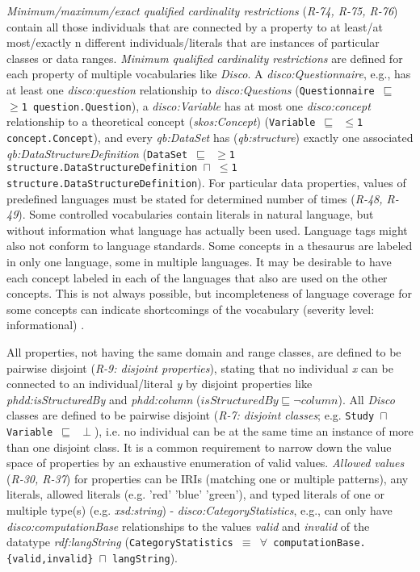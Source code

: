 \documentclass{llncs}
\newcommand{\ms}[1]{\texttt{#1}}
\begin{document}
{{\emph{Minimum/maximum/exact qualified cardinality restrictions} (\emph{R-74, R-75, R-76}) contain all those individuals that are connected by a property to at least/at most/exactly n different individuals/literals that are instances of particular classes or data ranges.
\emph{Minimum qualified cardinality restrictions} are defined for each property of multiple vocabularies like \emph{Disco}.
A \emph{disco:Questionnaire}, e.g., has at least one \emph{disco:question} relationship to \emph{disco:Questions} (\ms{Questionnaire $\sqsubseteq$ $\geq$1 question.Question}),
a \emph{disco:Variable} has at most one \emph{disco:concept} relationship to a theoretical concept (\emph{skos:Concept}) (\ms{Variable $\sqsubseteq$ $\leq$1 concept.Concept}), and every \emph{qb:DataSet} has (\emph{qb:structure}) exactly one associated \emph{qb:DataStructureDefinition} (\ms{DataSet $\sqsubseteq$ $\geq$1 structure.DataStructureDefinition $\sqcap$ $\leq$1 structure.DataStructureDefinition}).
For particular data properties, values of predefined languages must be stated for determined number of times (\emph{R-48, R-49}).
Some controlled vocabularies contain literals in natural language, but without information what language has actually been used. Language tags might also not conform to language standards. 
Some concepts in a thesaurus are labeled in only one language, some in multiple languages. It may be desirable to have each concept labeled in each of the languages that also are used on the other concepts. This is not always possible, but incompleteness of language coverage for some concepts can indicate shortcomings of the vocabulary
(severity level: informational) \cite{MaderHaslhoferIsaac2012}.

All properties, not having the same domain and range classes, are defined to be pairwise disjoint
(\emph{R-9: disjoint properties}), stating that no individual \emph{x} can be connected to an individual/literal \emph{y} by disjoint properties like \emph{phdd:isStructuredBy} and \emph{phdd:column} ($isStructuredBy \sqsubseteq \neg column$).
All \emph{Disco} classes are defined to be pairwise disjoint (\emph{R-7: disjoint classes}; e.g. \ms{Study $\sqcap$ Variable $\sqsubseteq$ $\perp$}),
i.e. no individual can be at the same time an instance of more than one disjoint class.
It is a common requirement to narrow down the value space of properties by an exhaustive enumeration of valid values.  
\emph{Allowed values} (\emph{R-30, R-37}) for properties can be IRIs (matching one or multiple patterns), any literals, allowed literals (e.g. 'red' 'blue' 'green'), and typed literals of one or multiple type(s) (e.g. \emph{xsd:string}) - 
\emph{disco:CategoryStatistics}, e.g., can only have \emph{disco:computationBase} relationships to the values \emph{valid} and \emph{invalid} of the datatype \emph{rdf:langString} (\ms{CategoryStatistics $\equiv$ $\forall$ computationBase.\{valid,invalid\} $\sqcap$ langString}).

}}
\end{document}
